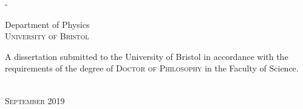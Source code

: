\begin{titlingpage}
\begin{SingleSpace}
\begin{adjustwidth*}{\unitlength}{-\unitlength}
\begin{center}
\vspace{30mm}
{\large Department of Physics\\
\textsc{University of Bristol}}\\
\vspace{15mm}
\begin{minipage}{8.5cm}
A dissertation submitted to the University of Bristol in accordance with the requirements of the degree of \textsc{Doctor of Philosophy} in the Faculty of Science.
\end{minipage}\\
\vspace{15mm}
{\large\textsc{September 2019}}
\vspace{12mm}
\end{center}
\end{adjustwidth*}
\end{SingleSpace}
\end{titlingpage}